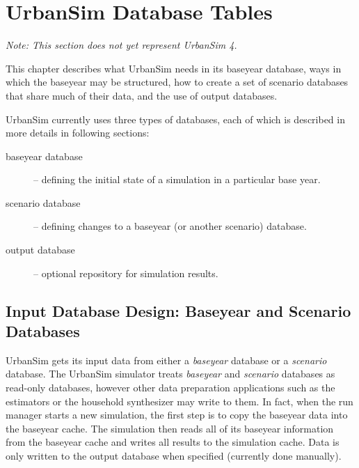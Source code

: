 

\chapter{UrbanSim Database Tables}
\label{chapter:urbansim-database-tables}

\emph{\Large Note: This section does not yet represent UrbanSim 4.}

This chapter describes what UrbanSim needs in its baseyear database, ways in
which the baseyear may be structured, how to create a set of scenario databases
that share much of their data, and the use of output databases.

UrbanSim currently uses three types of databases, each of which is described in
more details in following sections:

\begin{description}
\item[baseyear database] -- defining the initial state of a simulation in a
particular base year.
\item[scenario database] -- defining changes to a baseyear (or another scenario)
database.
\item[output database] -- optional repository for simulation results.
\end{description}

\section{Input Database Design: Baseyear and Scenario Databases}
\label{urbansim-database-tables-baseyear-scenario-db}

UrbanSim gets its input data from either a \emph{baseyear} database or a
\emph{scenario} database.  The UrbanSim simulator treats \emph{baseyear} and
\emph{scenario} databases as read-only databases, however other data
preparation applications such as the estimators or the household synthesizer
may write to them.  In fact, when the run manager starts a new simulation, the
first step is to copy the baseyear data into the baseyear cache. \baseyearcacheindex The
simulation then reads all of its baseyear information from the baseyear cache \baseyearcacheindex
and writes all results to the simulation cache. \simulationcacheindex Data is only written to the
output database when specified (currently done manually).


